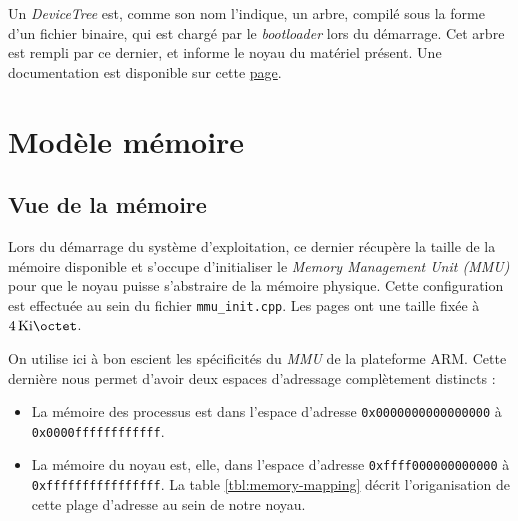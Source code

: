 \documentclass[french, 12pt]{article}
\begin{document}
Un \textit{DeviceTree} est, comme son nom l'indique, un arbre, compilé sous la
forme d'un fichier binaire, qui est chargé par le \textit{bootloader} lors du
démarrage. Cet arbre est rempli par ce dernier, et informe le noyau du matériel
présent. Une documentation est disponible sur cette
\href{https://www.devicetree.org/specifications/}{page}.

\section{Modèle mémoire}
\subsection{Vue de la mémoire}
Lors du démarrage du système d'exploitation, ce dernier récupère la taille de la
mémoire disponible et s'occupe d'initialiser le \textit{Memory Management Unit (MMU)}
pour que le noyau puisse s'abstraire de la mémoire physique. Cette configuration
est effectuée au sein du fichier \texttt{mmu\_init.cpp}. Les pages ont une
taille fixée à $\SI{4}{\kibi\octet}$.

On utilise ici à bon escient les spécificités du \textit{MMU} de la plateforme
ARM. Cette dernière nous permet d'avoir deux espaces d'adressage complètement
distincts :

\begin{itemize}
    \item La mémoire des processus est dans l'espace d'adresse \texttt{0x0000000000000000} à \texttt{0x0000ffffffffffff}.
    \item La mémoire du noyau est, elle, dans l'espace d'adresse \texttt{0xffff000000000000} à \texttt{0xffffffffffffffff}.
          La table \ref{tbl:memory-mapping} décrit l'origanisation de cette
          plage d'adresse au sein de notre noyau.
\end{itemize}
\end{document}

